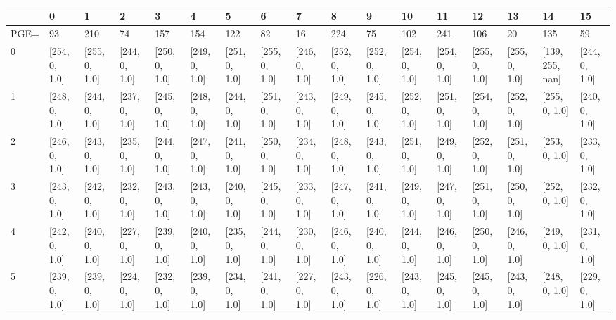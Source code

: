 \begin{tabular}{lllllllllllllllll}
\toprule
{} &             0  &             1  &             2  &             3  &             4  &             5  &             6  &             7  &             8  &             9  &             10 &             11 &             12 &             13 &               14 &             15 \\
\midrule
PGE= &             93 &            210 &             74 &            157 &            154 &            122 &             82 &             16 &            224 &             75 &            102 &            241 &            106 &             20 &              135 &             59 \\
0    &  [254, 0, 1.0] &  [255, 0, 1.0] &  [244, 0, 1.0] &  [250, 0, 1.0] &  [249, 0, 1.0] &  [251, 0, 1.0] &  [255, 0, 1.0] &  [246, 0, 1.0] &  [252, 0, 1.0] &  [252, 0, 1.0] &  [254, 0, 1.0] &  [254, 0, 1.0] &  [255, 0, 1.0] &  [255, 0, 1.0] &  [139, 255, nan] &  [244, 0, 1.0] \\
1    &  [248, 0, 1.0] &  [244, 0, 1.0] &  [237, 0, 1.0] &  [245, 0, 1.0] &  [248, 0, 1.0] &  [244, 0, 1.0] &  [251, 0, 1.0] &  [243, 0, 1.0] &  [249, 0, 1.0] &  [245, 0, 1.0] &  [252, 0, 1.0] &  [251, 0, 1.0] &  [254, 0, 1.0] &  [252, 0, 1.0] &    [255, 0, 1.0] &  [240, 0, 1.0] \\
2    &  [246, 0, 1.0] &  [243, 0, 1.0] &  [235, 0, 1.0] &  [244, 0, 1.0] &  [247, 0, 1.0] &  [241, 0, 1.0] &  [250, 0, 1.0] &  [234, 0, 1.0] &  [248, 0, 1.0] &  [243, 0, 1.0] &  [251, 0, 1.0] &  [249, 0, 1.0] &  [252, 0, 1.0] &  [251, 0, 1.0] &    [253, 0, 1.0] &  [233, 0, 1.0] \\
3    &  [243, 0, 1.0] &  [242, 0, 1.0] &  [232, 0, 1.0] &  [243, 0, 1.0] &  [243, 0, 1.0] &  [240, 0, 1.0] &  [245, 0, 1.0] &  [233, 0, 1.0] &  [247, 0, 1.0] &  [241, 0, 1.0] &  [249, 0, 1.0] &  [247, 0, 1.0] &  [251, 0, 1.0] &  [250, 0, 1.0] &    [252, 0, 1.0] &  [232, 0, 1.0] \\
4    &  [242, 0, 1.0] &  [240, 0, 1.0] &  [227, 0, 1.0] &  [239, 0, 1.0] &  [240, 0, 1.0] &  [235, 0, 1.0] &  [244, 0, 1.0] &  [230, 0, 1.0] &  [246, 0, 1.0] &  [240, 0, 1.0] &  [244, 0, 1.0] &  [246, 0, 1.0] &  [250, 0, 1.0] &  [246, 0, 1.0] &    [249, 0, 1.0] &  [231, 0, 1.0] \\
5    &  [239, 0, 1.0] &  [239, 0, 1.0] &  [224, 0, 1.0] &  [232, 0, 1.0] &  [239, 0, 1.0] &  [234, 0, 1.0] &  [241, 0, 1.0] &  [227, 0, 1.0] &  [243, 0, 1.0] &  [226, 0, 1.0] &  [243, 0, 1.0] &  [245, 0, 1.0] &  [245, 0, 1.0] &  [243, 0, 1.0] &    [248, 0, 1.0] &  [229, 0, 1.0] \\

\end{tabular}
